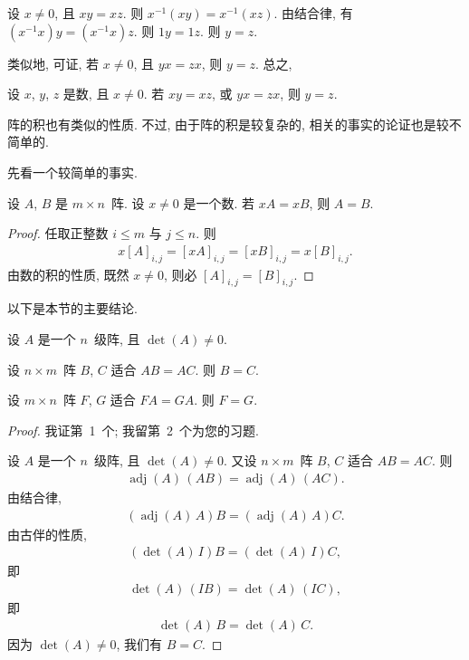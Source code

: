 设 \(x \neq 0\), 且 \(xy = xz\).
则 \(x^{-1} (xy) = x^{-1} (xz)\).
由结合律, 有 \((x^{-1} x) y = (x^{-1} x) z\).
则 \(1y = 1z\).
则 \(y = z\).

类似地, 可证,
若 \(x \neq 0\), 且 \(yx = zx\), 则 \(y = z\).
总之,

\begin{theorem}
    设 \(x\), \(y\), \(z\) 是数, 且 \(x \neq 0\).
    若 \(xy = xz\), 或 \(yx = zx\), 则 \(y = z\).
\end{theorem}

阵的积也有类似的性质.
不过, 由于阵的积是较复杂的, 相关的事实的论证也是较不简单的.

先看一个较简单的事实.

\begin{theorem}
    设 \(A\), \(B\) 是 \(m \times n\)~阵.
    设 \(x \neq 0\) 是一个数.
    若 \(xA = xB\), 则 \(A = B\).
\end{theorem}

\begin{proof}
    任取正整数 \(i \leq m\) 与 \(j \leq n\).
    则
    \begin{align*}
        x [A]_{i,j} = [xA]_{i,j} = [xB]_{i,j} = x [B]_{i,j}.
    \end{align*}
    由数的积的性质, 既然 \(x \neq 0\),
    则必 \([A]_{i,j} = [B]_{i,j}\).
\end{proof}

以下是本节的主要结论.

\begin{theorem}
    设 \(A\) 是一个 \(n\)~级阵, 且 \(\det {(A)} \neq 0\).

    设 \(n \times m\)~阵 \(B\), \(C\) 适合 \(AB = AC\).
    则 \(B = C\).

    设 \(m \times n\)~阵 \(F\), \(G\) 适合 \(FA = GA\).
    则 \(F = G\).
\end{theorem}

\begin{proof}
    我证第~1~个; 我留第~2~个为您的习题.

    设 \(A\) 是一个 \(n\)~级阵, 且 \(\det {(A)} \neq 0\).
    又设 \(n \times m\)~阵 \(B\), \(C\) 适合 \(AB = AC\).
    则
    \begin{align*}
        \operatorname{adj} {(A)}\, (AB)
        = \operatorname{adj} {(A)}\, (AC).
    \end{align*}
    由结合律,
    \begin{align*}
        (\operatorname{adj} {(A)}\, A) B
        = (\operatorname{adj} {(A)}\, A) C.
    \end{align*}
    由古伴的性质,
    \begin{align*}
        (\det {(A)}\, I) B = (\det {(A)}\, I) C,
    \end{align*}
    即
    \begin{align*}
        \det {(A)}\, (I B) = \det {(A)}\, (I C),
    \end{align*}
    即
    \begin{align*}
        \det {(A)}\, B = \det {(A)}\, C.
    \end{align*}
    因为 \(\det {(A)} \neq 0\),
    我们有 \(B = C\).
\end{proof}

